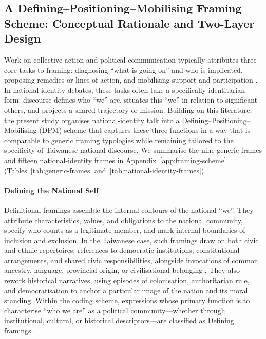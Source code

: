 \documentclass[man,12pt]{apa7}
\begin{document}
\subsection{A Defining–Positioning–Mobilising Framing Scheme: Conceptual Rationale and Two-Layer Design}

Work on collective action and political communication typically attributes three core tasks to framing: diagnosing ``what is going on'' and who is implicated, proposing remedies or lines of action, and mobilising support and participation \parencite{benford2000,entman1993,snow2013}. 
In national-identity debates, these tasks often take a specifically identitarian form: discourse defines who ``we'' are, situates this ``we'' in relation to significant others, and projects a shared trajectory or mission. 
Building on this literature, the present study organises national-identity talk into a Defining–Positioning–Mobilising (DPM) scheme that captures these three functions in a way that is comparable to generic framing typologies while remaining tailored to the specificity of Taiwanese national discourse. 
We summarise the nine generic frames and fifteen national-identity frames in Appendix~\ref{app:framing-scheme} (Tables~\ref{tab:generic-frames} and~\ref{tab:national-identity-frames}).\\%
\paragraph{Defining the National Self}

Definitional framings assemble the internal contours of the national ``we''. 
They attribute characteristics, values, and obligations to the national community, specify who counts as a legitimate member, and mark internal boundaries of inclusion and exclusion. 
In the Taiwanese case, such framings draw on both civic and ethnic repertoires: references to democratic institutions, constitutional arrangements, and shared civic responsibilities, alongside invocations of common ancestry, language, provincial origin, or civilisational belonging \parencite{huang2005,wu2000,zhong2016}. 
They also rework historical narratives, using episodes of colonisation, authoritarian rule, and democratisation to anchor a particular image of the nation and its moral standing. 
Within the coding scheme, expressions whose primary function is to characterise ``who we are'' as a political community—whether through institutional, cultural, or historical descriptors—are classified as Defining framings.\\%
\end{document}
